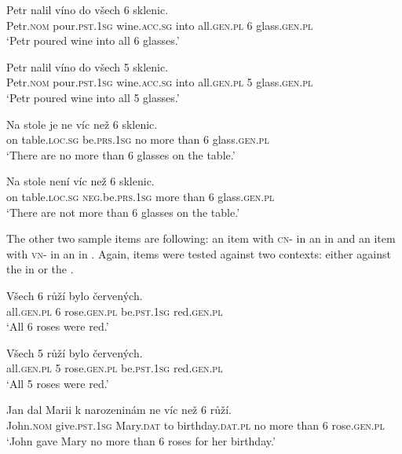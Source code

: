 \documentclass[output=paper, colorlinks, citecolor=brown, newtxmath]{langsci/langscibook}
\begin{document}
\ea
\gll Petr nalil víno do všech 6 sklenic.\\
Petr.\textsc{nom} pour.\textsc{pst.1sg} wine.\textsc{acc.sg} into all.\textsc{gen.pl} 6 glass.\textsc{gen.pl}\\\hfill{}
\glt `Petr poured wine into all 6 glasses.' \label{ex:wine_e}
\z


\ea
\gll Petr nalil víno do všech 5 sklenic.\\
Petr.\textsc{nom} pour.\textsc{pst.1sg} wine.\textsc{acc.sg} into all.\textsc{gen.pl} 5 glass.\textsc{gen.pl}\\\hfill{}
\glt `Petr poured wine into all 5 glasses.' \label{ex:wine_n}
\z

\ea
\gll Na stole je ne víc než 6 sklenic.\label{ex:pcn}\\
on table.\textsc{loc.sg} be.\textsc{prs.1sg} no more than 6 glass.\textsc{gen.pl}\\\hfill {}
\glt `There are no more than 6 glasses on the table.'
\z

\ea
\gll Na stole není víc než 6 sklenic.\label{ex:pvn}\\
on table.\textsc{loc.sg} \textsc{neg}.be.\textsc{prs.1sg} more than 6 glass.\textsc{gen.pl}\\\hfill {}
\glt `There are not more than 6 glasses on the table.'
\z


\noindent The other two sample items are following: an item with \textsc{cn-} in an  in  and an item with \textsc{vn-} in an  in . Again, items were tested against two contexts: either against the  in  or the  .

\ea
\gll Všech 6 růží bylo červených.\\
all.\textsc{gen.pl} 6 rose.\textsc{gen.pl} be.\textsc{pst.1sg} red.\textsc{gen.pl}\\\hfill{}
\glt `All 6 roses were red.'  \label{ex:rose_e}
\z

\ea
\gll Všech 5 růží bylo červených.\\
all.\textsc{gen.pl} 5 rose.\textsc{gen.pl} be.\textsc{pst.1sg} red.\textsc{gen.pl}\\\hfill{}
\glt `All 5 roses were red.'  \label{ex:rose_n}
\z

\ea
\gll Jan dal Marii k narozeninám ne víc než 6 růží.\label{ex:ocn}\\
John.\textsc{nom} give.\textsc{pst.1sg} Mary.\textsc{dat} to birthday.\textsc{dat.pl} no more than 6 rose.\textsc{gen.pl}\\\hfill {}
\glt `John gave Mary no more than 6 roses for her birthday.'
\z
\end{document}

